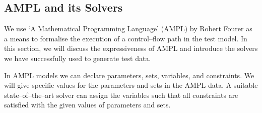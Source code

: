 \documentclass[runningheads,a4paper]{llncs}%
\begin{document}
\subsection{AMPL and its Solvers}%
\label{sec:AMPL}%
We use `A Mathematical Programming Language' (AMPL) by Robert Fourer \cite{AMPL} as a means to formalise the execution of a control--flow path in the test model. In this section, we will discuss the expressiveness of AMPL and introduce the solvers we have successfully used to generate test data.

In AMPL models we can declare parameters, sets, variables, and constraints. We will give specific values for the parameters and sets in the AMPL data. A suitable state--of--the--art solver can assign the variables such that all constraints are satisfied with the given values of parameters and sets.
\end{document}
